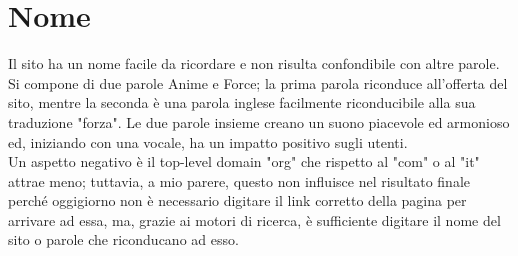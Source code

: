 \section{Nome} \label{Nome}
Il sito ha un nome facile da ricordare e non risulta confondibile con altre parole. Si compone di due parole Anime e Force; la prima parola riconduce all'offerta del sito, mentre la seconda è una parola inglese facilmente riconducibile alla sua traduzione "forza". Le due parole insieme creano un suono piacevole ed armonioso ed, iniziando con una vocale, ha un impatto positivo sugli utenti. \\
Un aspetto negativo è il top-level domain "org" che rispetto al "com" o al "it" attrae meno; tuttavia, a mio parere, questo non influisce nel risultato finale perché oggigiorno non è necessario digitare il link corretto della pagina per arrivare ad essa, ma, grazie ai motori di ricerca, è sufficiente digitare il nome del sito o parole che riconducano ad esso.